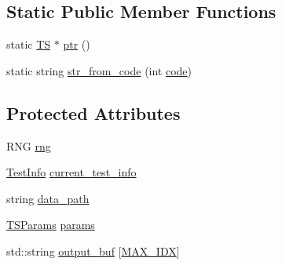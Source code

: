 \subsection*{Static Public Member Functions}
\begin{DoxyCompactItemize}
\item 
static \hyperlink{classcvtest_1_1TS}{T\-S} $\ast$ \hyperlink{classcvtest_1_1TS_a627cd5c81db94ccae75c6f04af396497}{ptr} ()
\item 
static string \hyperlink{classcvtest_1_1TS_a1ea40eed543ff4a079a8ae9275362ad8}{str\-\_\-from\-\_\-code} (int \hyperlink{imgproc__c_8h_a9a9fd13fa1f888f8baeda154bb1a3691}{code})
\end{DoxyCompactItemize}
\subsection*{Protected Attributes}
\begin{DoxyCompactItemize}
\item 
R\-N\-G \hyperlink{classcvtest_1_1TS_aeef5453eb56944916a092c0dd225ab5e}{rng}
\item 
\hyperlink{structcvtest_1_1TestInfo}{Test\-Info} \hyperlink{classcvtest_1_1TS_a5a64dcb103bce8b6efdece7901900e11}{current\-\_\-test\-\_\-info}
\item 
string \hyperlink{classcvtest_1_1TS_a819fea5ad66ed952dab11fbba9bfb49d}{data\-\_\-path}
\item 
\hyperlink{structcvtest_1_1TSParams}{T\-S\-Params} \hyperlink{classcvtest_1_1TS_a4629947fcef74e97555f2ca01480b9ef}{params}
\item 
std\-::string \hyperlink{classcvtest_1_1TS_a1f1690ef50b8b5f6cf1c661805e6f377}{output\-\_\-buf} \mbox{[}\hyperlink{classcvtest_1_1TS_a4d6d5cf94c1f5e8cdaddf2a2efe1be0aa223feca68f6657aca9967e4f4e405612}{M\-A\-X\-\_\-\-I\-D\-X}\mbox{]}
\end{DoxyCompactItemize}


